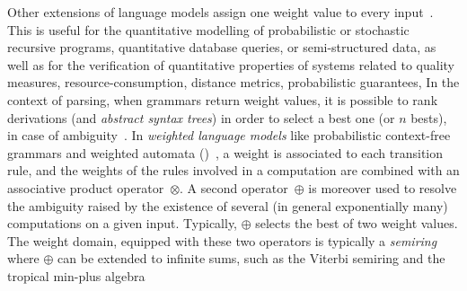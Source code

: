 Other extensions of language models  %
assign one weight value to every input~\cite{Droste09handbook}.
This is useful for the quantitative modelling of
\eg probabilistic or stochastic recursive programs, %
quantitative database queries, or semi-structured data, %
as well as for the verification of quantitative properties of systems
related to %
quality measures, resource-consumption, distance metrics, probabilistic guarantees, \etc
%
In the context of parsing, when grammars return weight values, 
it is possible to rank derivations (and \emph{abstract syntax trees})
in order to select a best one (or $n$ bests),
\eg in case of ambiguity~\cite{Goodman99SemiringParsing,Nederhof03weightedParsing,MorbitzVogler19weighted-parsing}.
%
In \emph{weighted language models}
like \eg probabilistic context-free grammars %
and weighted automata (\WA)~\cite{Droste09handbook},
a weight is associated to each transition rule, %
and the weights of the rules involved in a computation are combined with an
associative product operator~$\otimes$. %
A second operator~$\oplus$
is moreover used to resolve the ambiguity raised by the existence
of several (in general exponentially many) computations on a given input.
Typically, $\oplus$ selects the best of two weight values.
The weight domain, equipped with these two operators is typically 
a \emph{semiring} %
where $\oplus$ can be extended to infinite sums,
such as the Viterbi semiring and the tropical min-plus algebra%

